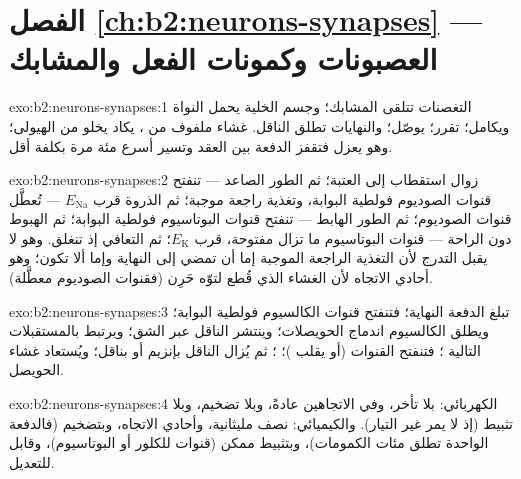 \section*{الفصل \ref{ch:b2:neurons-synapses} --- العصبونات وكمونات الفعل والمشابك}

\begin{solution}{exo:b2:neurons-synapses:1}
التغصنات تتلقى المشابك؛ وجسم الخلية يحمل النواة
ويكامل؛  تقرر؛  يوصّل؛
والنهايات تطلق الناقل.  غشاء ملفوف من
، يكاد يخلو من الهيولى؛ وهو يعزل  فتقفز
الدفعة بين العقد وتسير أسرع مئة مرة
بكلفة أقل.
\end{solution}

\begin{solution}{exo:b2:neurons-synapses:2}
زوال استقطاب إلى العتبة؛ ثم الطور الصاعد --- تنفتح قنوات
الصوديوم فولطية البوابة، وتغذية راجعة موجبة؛ ثم الذروة قرب $E_{\mathrm{Na}}$ ---
تُعطَّل قنوات الصوديوم؛ ثم الطور الهابط --- تنفتح قنوات البوتاسيوم
فولطية البوابة؛ ثم الهبوط دون الراحة --- قنوات البوتاسيوم ما تزال مفتوحة، قرب
$E_{\mathrm K}$؛ ثم التعافي إذ تنغلق. وهو لا يقبل التدرج لأن
التغذية الراجعة الموجبة إما أن تمضي إلى النهاية وإما ألا تكون؛ وهو أحادي الاتجاه
لأن الغشاء الذي قُطع لتوّه حَرِن (فقنوات الصوديوم
معطَّلة).
\end{solution}

\begin{solution}{exo:b2:neurons-synapses:3}
تبلغ الدفعة النهاية؛ فتنفتح قنوات الكالسيوم فولطية البوابة؛
ويطلق الكالسيوم اندماج الحويصلات؛ وينتشر الناقل عبر
الشق؛ ويرتبط بالمستقبلات التالية ؛ فتنفتح القنوات (أو يقلب )؛ ؛ ثم يُزال الناقل بإنزيم أو
بناقل؛ ويُستعاد غشاء الحويصل.
\end{solution}

\begin{solution}{exo:b2:neurons-synapses:4}
الكهربائي: بلا تأخر، وفي الاتجاهين عادةً، وبلا تضخيم، وبلا
تثبيط (إذ لا يمر غير التيار). والكيميائي: نصف مليثانية،
وأحادي الاتجاه، وبتضخيم (فالدفعة الواحدة تطلق مئات الكمومات)،
وبتثبيط ممكن (قنوات للكلور أو البوتاسيوم)، وقابل
للتعديل.
\end{solution}

